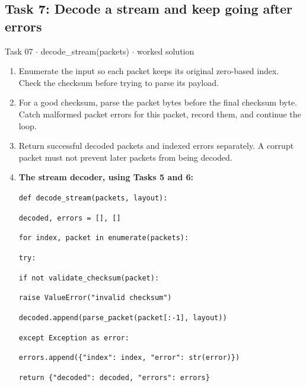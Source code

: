 \documentclass[11pt]{article}
\begin{document}
\begin{keepsection}\subsection{Task 7: Decode a stream and keep going after errors}

\begin{workedbox}{Task 07 \ensuremath{\cdot} decode\_stream(packets) \ensuremath{\cdot} worked solution}
\begin{enumerate}
\item Enumerate the input so each packet keeps its original zero-based index. Check the checksum before trying to parse its payload.
\item For a good checksum, parse the packet bytes before the final checksum byte. Catch malformed packet errors for this packet, record them, and continue the loop.
\item Return successful decoded packets and indexed errors separately. A corrupt packet must not prevent later packets from being decoded.
\item {}
\textbf{The stream decoder, using Tasks 5 and 6:}
\begin{tcolorbox}[colback=Paperblue,colframe=Paperblue,boxrule=0pt,arc=0pt,left=7pt,right=7pt,top=5pt,bottom=5pt]\small\sloppy
\noindent\hspace*{0em}\texttt{def decode\_stream(packets, layout):}\par
\noindent\hspace*{1em}\texttt{decoded, errors = [], []}\par
\noindent\hspace*{1em}\texttt{for index, packet in enumerate(packets):}\par
\noindent\hspace*{3em}\texttt{try:}\par
\noindent\hspace*{5em}\texttt{if not validate\_checksum(packet):}\par
\noindent\hspace*{7em}\texttt{raise ValueError("invalid checksum")}\par
\noindent\hspace*{5em}\texttt{decoded.append(parse\_packet(packet[:-1], layout))}\par
\noindent\hspace*{3em}\texttt{except Exception as error:}\par
\noindent\hspace*{5em}\texttt{errors.append(\{"index": index, "error": str(error)\})}\par
\noindent\hspace*{1em}\texttt{return \{"decoded": decoded, "errors": errors\}}\par
\end{tcolorbox}
\end{enumerate}
\end{workedbox}

\end{keepsection}
\end{document}
